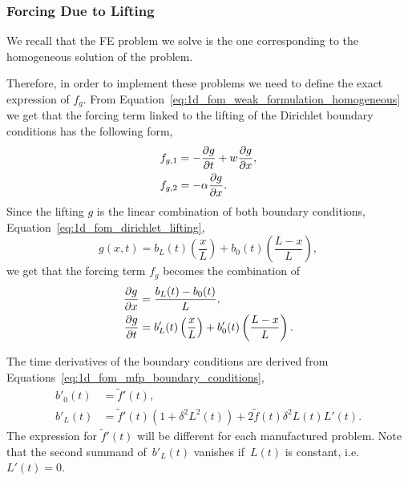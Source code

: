 \documentclass[../main.tex]{subfiles}
\begin{document}
\subsubsection{Forcing Due to Lifting}
We recall that the FE problem we solve is the one corresponding to the homogeneous solution of the problem. 

Therefore, in order to implement these problems we need to define the exact expression of $f_g$.
From Equation~\eqref{eq:1d_fom_weak_formulation_homogeneous} we get that the forcing term linked to the lifting of the Dirichlet boundary conditions has the following form,
\begin{align}
    f_{g,1} &= - \frac{\partial g}{\partial t} + w \pdv{g}{x}, \\
    f_{g,2} &= - \alpha \pdv{g}{x}.
\end{align}
Since the lifting $g$ is the linear combination of both boundary conditions, Equation~\eqref{eq:1d_fom_dirichlet_lifting},
\begin{equation}
    g(x,t) = b_L(t) \left(\frac{x}{L}\right) + b_0(t) \left(\frac{L - x}{L}\right),
\end{equation}
we get that the forcing term $f_g$ becomes the combination of
\begin{subequations}
    \begin{align}
        \pdv{g}{x} &= \frac{b_L(t) - b_0(t)}{L}, \\
        \pdv{g}{t} &= b'_L(t) \left(\frac{x}{L}\right) + b'_0(t) \left(\frac{L - x}{L}\right)
        .
    \end{align}
\end{subequations}

The time derivatives of the boundary conditions are derived from Equations~\eqref{eq:1d_fom_mfp_boundary_conditions}, 
\begin{subequations}
    \begin{align}
        b'_0(t) &= \tilde{f}'(t), \\
        b'_L(t) &= \tilde{f}'(t)\left(1 + \delta^2L^2(t)\right) + 2\tilde{f}(t) \delta^2 L(t)L'(t).
    \end{align}
\end{subequations}
The expression for $\tilde{f}'(t)$ will be different for each manufactured problem.
Note that the second summand of~$b'_L(t)$ vanishes if~$L(t)$ is constant, i.e. $L'(t)=0$.  
\end{document}

